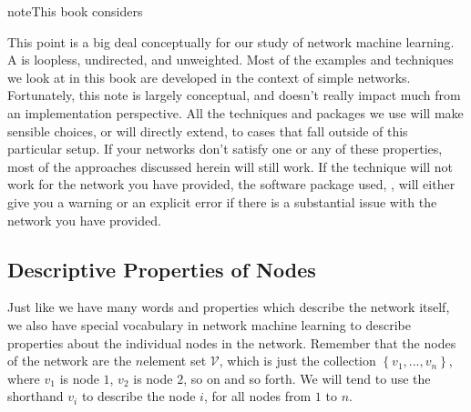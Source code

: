 \documentclass[letterpaper,10pt,english]{jupyterBook}
\begin{document}
\begin{sphinxadmonition}{note}{This book considers }

\sphinxAtStartPar
This point is a  big deal conceptually for our study of network machine learning. A  is loopless, undirected, and unweighted. Most of the examples and techniques we look at in this book are developed in the context of simple networks. Fortunately, this note is largely conceptual, and doesn’t really impact much from an implementation perspective. All the techniques and packages we use will make sensible choices, or will directly extend, to cases that fall outside of this particular setup. If your networks don’t satisfy one or any of these properties, most of the approaches discussed herein will still work. If the technique will not work for the network you have provided, the software package used, , will either give you a warning or an explicit error if there is a substantial issue with the network you have provided.
\end{sphinxadmonition}


\subsection{Descriptive Properties of Nodes}
\label{\detokenize{representations/ch4/properties-of-networks:descriptive-properties-of-nodes}}
\sphinxAtStartPar
Just like we have many words and properties which describe the network itself, we also have special vocabulary in network machine learning to describe properties about the individual nodes in the network. Remember that the nodes of the network are the \(n\)\sphinxhyphen{}element set \(\mathcal V\), which is just the collection \(\left\{v_1, ..., v_n\right\}\), where \(v_1\) is node \(1\), \(v_2\) is node \(2\), so on and so forth. We will tend to use the short\sphinxhyphen{}hand \(v_i\) to describe the node \(i\), for all nodes from \(1\) to \(n\).
\end{document}
